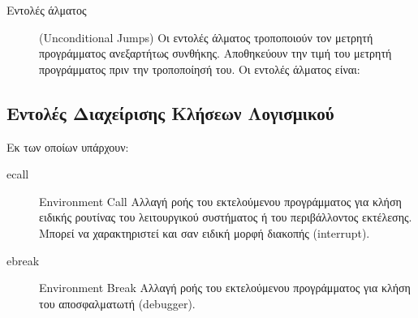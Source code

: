 \documentclass[11pt]{extarticle}
\begin{document}
\begin{description}
        \newpage
        \item[Εντολές άλματος] (Unconditional Jumps) \newline
        Οι εντολές άλματος τροποποιούν τον μετρητή προγράμματος ανεξαρτήτως συνθήκης.
        Αποθηκεύουν την τιμή του μετρητή προγράμματος πριν την τροποποίησή του.
        Οι εντολές άλματος είναι:
        \begin{table}[H]
            \caption{\label{tab:widgets}Εντολές τύπου Jump}
        \end{table}
    \end{description}

    \subsection{Εντολές Διαχείρισης Κλήσεων Λογισμικού}
    Εκ των οποίων υπάρχουν:
    \begin{description} 
        \item [ecall\footnotemark] Environment Call \newline
        Αλλαγή ροής του εκτελούμενου προγράμματος για κλήση ειδικής ρουτίνας του λειτουργικού συστήματος ή του περιβάλλοντος εκτέλεσης.
        Μπορεί να χαρακτηριστεί και σαν ειδική μορφή διακοπής (interrupt).
        \item [ebreak\footnotemark] Environment Break \newline
        Αλλαγή ροής του εκτελούμενου προγράμματος για κλήση του αποσφαλματωτή (debugger).
    \end{description}
\end{document}
